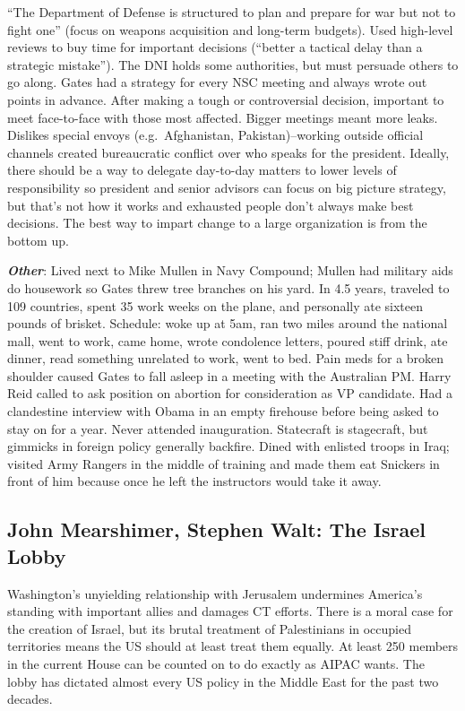 \documentclass[
]{article}
\begin{document}
``The Department of Defense is structured to plan and prepare for war
but not to fight one'' (focus on weapons acquisition and long-term
budgets). Used high-level reviews to buy time for important decisions
(``better a tactical delay than a strategic mistake''). The DNI holds
some authorities, but must persuade others to go along. Gates had a
strategy for every NSC meeting and always wrote out points in advance.
After making a tough or controversial decision, important to meet
face-to-face with those most affected. Bigger meetings meant more leaks.
Dislikes special envoys (e.g.~Afghanistan, Pakistan)--working outside
official channels created bureaucratic conflict over who speaks for the
president. Ideally, there should be a way to delegate day-to-day matters
to lower levels of responsibility so president and senior advisors can
focus on big picture strategy, but that's not how it works and exhausted
people don't always make best decisions. The best way to impart change
to a large organization is from the bottom up.

\textbf{\emph{Other}}: Lived next to Mike Mullen in Navy Compound;
Mullen had military aids do housework so Gates threw tree branches on
his yard. In 4.5 years, traveled to 109 countries, spent 35 work weeks
on the plane, and personally ate sixteen pounds of brisket. Schedule:
woke up at 5am, ran two miles around the national mall, went to work,
came home, wrote condolence letters, poured stiff drink, ate dinner,
read something unrelated to work, went to bed. Pain meds for a broken
shoulder caused Gates to fall asleep in a meeting with the Australian
PM. Harry Reid called to ask position on abortion for consideration as
VP candidate. Had a clandestine interview with Obama in an empty
firehouse before being asked to stay on for a year. Never attended
inauguration. Statecraft is stagecraft, but gimmicks in foreign policy
generally backfire. Dined with enlisted troops in Iraq; visited Army
Rangers in the middle of training and made them eat Snickers in front of
him because once he left the instructors would take it away.

\hypertarget{john-mearshimer-stephen-walt-the-israel-lobby}{%
\subsection{John Mearshimer, Stephen Walt: The Israel
Lobby}\label{john-mearshimer-stephen-walt-the-israel-lobby}}

Washington's unyielding relationship with Jerusalem undermines America's
standing with important allies and damages CT efforts. There is a moral
case for the creation of Israel, but its brutal treatment of
Palestinians in occupied territories means the US should at least treat
them equally. At least 250 members in the current House can be counted
on to do exactly as AIPAC wants. The lobby has dictated almost every US
policy in the Middle East for the past two decades.
\end{document}
